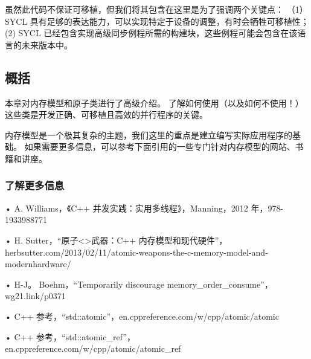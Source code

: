 虽然此代码不保证可移植，但我们将其包含在这里是为了强调两个关键点：
（1）SYCL 具有足够的表达能力，可以实现特定于设备的调整，有时会牺牲可移植性； 
(2) SYCL 已经包含实现高级同步例程所需的构建块，这些例程可能会包含在该语言的未来版本中。

\subsection{概括}
本章对内存模型和原子类进行了高级介绍。 
了解如何使用（以及如何不使用！）这些类是开发正确、可移植且高效的并行程序的关键。

内存模型是一个极其复杂的主题，我们这里的重点是建立编写实际应用程序的基础。 
如果需要更多信息，可以参考下面引用的一些专门针对内存模型的网站、书籍和讲座。

\subsubsection{了解更多信息}
• A. Williams，《C++ 并发实践：实用多线程》，Manning，2012 年，978-1933988771

• H. Sutter，“原子<>武器：C++ 内存模型和现代硬件”，herbsutter.com/2013/02/11/atomic-weapons-the-c-memory-model-and-modernhardware/

• H-J。 Boehm，“Temporarily discourage memory\_order\_consume”，wg21.link/p0371

• C++ 参考，“std::atomic”，en.cppreference.com/w/cpp/atomic/atomic

• C++ 参考，“std::atomic\_ref”，en.cppreference.com/w/cpp/atomic/atomic\_ref